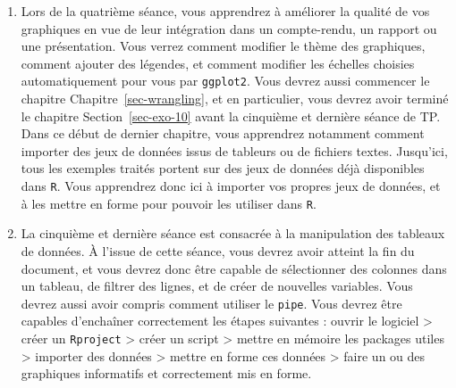 \documentclass[
  a4paper,
  DIV=11,
  numbers=noendperiod,
  oneside]{scrreprt}
\begin{document}
\begin{enumerate}
  plus. Avant la quatrième séance, vous devrez avoir terminé la section
  Section~\ref{sec-simpson}. Vous devriez donc être capable de faire,
  outre les graphiques de la semaine précédente, des nuages de points,
  des stripcharts, des graphiques en lignes et des boîtes à moustaches
  (ou boxplots). Vous devriez aussi être capable de distinguer deux
  types de représentations graphiques assez proches dans leur forme,
  mais fondamentalement différentes dans leur utilisation et leur
  interprétation : les histogrammes et les diagrammes bâtons : dans
  quelle situation utilise-t-on plutôt l'un ou l'autre ? Quel type de
  variable utiliser pour produire un histogramme ou un diagramme bâtons
  ? À quoi correspond l'axe des ordonnées de ces graphiques et comment
  est-il obtenu ? Enfin, vous devriez également être capable de faire
  des sous-graphiques par catégories (\texttt{facet}). Il s'agit là
  d'une possibilité extrêmement puissante pour ``découper'' vos données
  et visualiser les relations entre plusieurs variables.
\item
  Lors de la quatrième séance, vous apprendrez à améliorer la qualité de
  vos graphiques en vue de leur intégration dans un compte-rendu, un
  rapport ou une présentation. Vous verrez comment modifier le thème des
  graphiques, comment ajouter des légendes, et comment modifier les
  échelles choisies automatiquement pour vous par \texttt{ggplot2}. Vous
  devrez aussi commencer le chapitre Chapitre~\ref{sec-wrangling}, et en
  particulier, vous devrez avoir terminé le chapitre
  Section~\ref{sec-exo-10} avant la cinquième et dernière séance de TP.
  Dans ce début de dernier chapitre, vous apprendrez notamment comment
  importer des jeux de données issus de tableurs ou de fichiers textes.
  Jusqu'ici, tous les exemples traités portent sur des jeux de données
  déjà disponibles dans \texttt{R}. Vous apprendrez donc ici à importer
  vos propres jeux de données, et à les mettre en forme pour pouvoir les
  utiliser dans \texttt{R}.
\item
  La cinquième et dernière séance est consacrée à la manipulation des
  tableaux de données. À l'issue de cette séance, vous devrez avoir
  atteint la fin du document, et vous devrez donc être capable de
  sélectionner des colonnes dans un tableau, de filtrer des lignes, et
  de créer de nouvelles variables. Vous devrez aussi avoir compris
  comment utiliser le \texttt{pipe}. Vous devrez être capables
  d'enchaîner correctement les étapes suivantes : ouvrir le logiciel
  \textgreater{} créer un \texttt{Rproject} \textgreater{} créer un
  script \textgreater{} mettre en mémoire les packages utiles
  \textgreater{} importer des données \textgreater{} mettre en forme ces
  données \textgreater{} faire un ou des graphiques informatifs et
  correctement mis en forme.
\end{enumerate}
\end{document}
